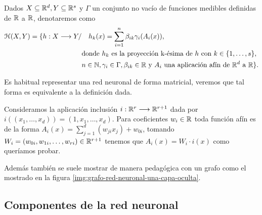 \begin{definicion} \label{definition:redes_neuronales_una_capa_oculta}
    Dados $X \subseteq \mathbb{R}^d, Y \subseteq \mathbb{R}^s$ y  $\Gamma$ un conjunto no vacío de funciones medibles definidas de $\mathbb{R}$ a $\mathbb{R}$, denotaremos como 
    \begin{align}
        \mathcal{H}(X,Y) 
        =
        \{
            h : X \longrightarrow Y 
            /& \quad 
            h_k(x) = 
            \sum_{i=1}^{n} \beta_{i k} \gamma_{i}( A_{i}(x)), \\
            & \text{donde  $h_k$  es la proyección k-ésima de $h$ con 
            $k \in \{1, \ldots, s\}$}, \\
            & n \in \mathbb{N},\gamma_{i} \in \Gamma , \beta_{i k} \in \mathbb{R}
             \text{ y }A_{i} \text{ una aplicación afín de $\mathbb{R}^d$ a $\mathbb{R}$}           
        \}.
    \end{align}
\end{definicion}
\normalmarginpar
\setlength{\marginparwidth}{\bigMarginSize}


Es habitual representar una red neuronal de forma matricial, veremos que tal forma es equivalente a la definición dada. 

Consideramos la aplicación inclusión 
$i: \mathbb{R}^r \longrightarrow \mathbb{R}^{r+1}$ dada por 
 $i((x_1, \ldots, x_d)) = (1,x_1, \ldots, x_d).$
Para coeficientes $w_i \in \mathbb{R}$ toda función afín es de la forma 
$A_{i}(x)= \sum_{j=1}^d( w_{j i} x_j) + w_{0i}$, 
tomando $W_i = (w_{0 i}, w_{1 i}, \ldots, w_{r i}) \in \mathbb{R}^{r+1}$ tenemos que 
$A_i(x) = W_i \cdot i(x)$ como queríamos probar. 

Además también se suele mostrar de manera pedagógica con un grafo como el mostrado en la 
figura \ref{img:grafo-red-neuronal-una-capa-oculta}.


\subsection*{Componentes de la red neuronal}  

